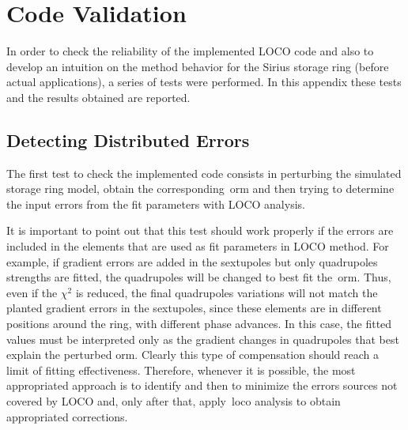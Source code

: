 \chapter{Code Validation}\label{appendix:code_test}
In order to check the reliability of the implemented LOCO code and also to develop an intuition on the method behavior for the Sirius storage ring (before actual applications), a series of tests were performed. In this appendix these tests and the results obtained are reported.

\section{Detecting Distributed Errors}
The first test to check the implemented code consists in perturbing the simulated storage ring model, obtain the corresponding~\gls{orm} and then trying to determine the input errors from the fit parameters with LOCO analysis. 


It is important to point out that this test should work properly if the errors are included in the elements that are used as fit parameters in LOCO method. For example, if gradient errors are added in the sextupoles but only quadrupoles strengths are fitted, the quadrupoles will be changed to best fit the~\gls{orm}. Thus, even if the $\chi^2$ is reduced, the final quadrupoles variations will not match the planted gradient errors in the sextupoles, since these elements are in different positions around the ring, with different phase advances. In this case, the fitted values must be interpreted only as the gradient changes in quadrupoles that best explain the perturbed \gls{orm}. Clearly this type of compensation should reach a limit of fitting effectiveness. Therefore, whenever it is possible, the most appropriated approach is to identify and then to minimize the errors sources not covered by LOCO and, only after that, apply~\gls{loco} analysis to obtain appropriated corrections.

